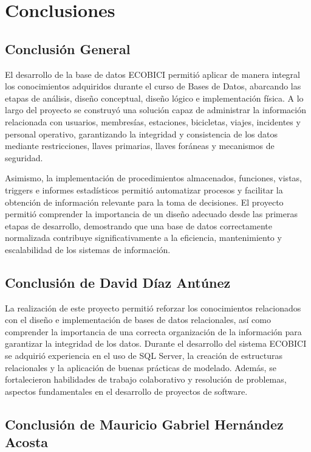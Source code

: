 \section{Conclusiones}

\subsection{Conclusión General}

El desarrollo de la base de datos ECOBICI permitió aplicar de manera integral los conocimientos adquiridos durante el curso de Bases de Datos, abarcando las etapas de análisis, diseño conceptual, diseño lógico e implementación física. A lo largo del proyecto se construyó una solución capaz de administrar la información relacionada con usuarios, membresías, estaciones, bicicletas, viajes, incidentes y personal operativo, garantizando la integridad y consistencia de los datos mediante restricciones, llaves primarias, llaves foráneas y mecanismos de seguridad.

Asimismo, la implementación de procedimientos almacenados, funciones, vistas, triggers e informes estadísticos permitió automatizar procesos y facilitar la obtención de información relevante para la toma de decisiones. El proyecto permitió comprender la importancia de un diseño adecuado desde las primeras etapas de desarrollo, demostrando que una base de datos correctamente normalizada contribuye significativamente a la eficiencia, mantenimiento y escalabilidad de los sistemas de información.

\subsection{Conclusión de David Díaz Antúnez}

La realización de este proyecto permitió reforzar los conocimientos relacionados con el diseño e implementación de bases de datos relacionales, así como comprender la importancia de una correcta organización de la información para garantizar la integridad de los datos. Durante el desarrollo del sistema ECOBICI se adquirió experiencia en el uso de SQL Server, la creación de estructuras relacionales y la aplicación de buenas prácticas de modelado. Además, se fortalecieron habilidades de trabajo colaborativo y resolución de problemas, aspectos fundamentales en el desarrollo de proyectos de software.

\subsection{Conclusión de Mauricio Gabriel Hernández Acosta}

